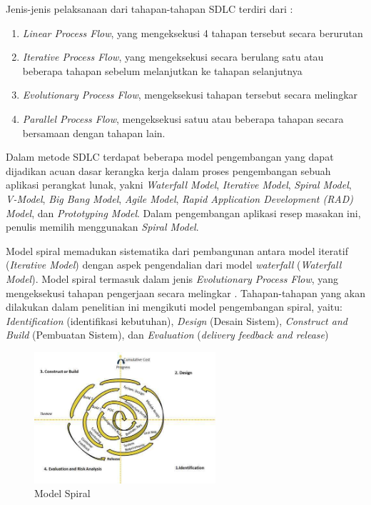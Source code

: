 	Jenis-jenis pelaksanaan dari tahapan-tahapan SDLC terdiri dari \cite{pressman}:
	\begin{enumerate}
		\item \emph{Linear Process Flow}, yang mengeksekusi 4 tahapan tersebut secara berurutan
		\item \emph{Iterative Process Flow}, yang mengeksekusi secara berulang satu atau beberapa tahapan sebelum melanjutkan ke tahapan selanjutnya
		\item \emph{Evolutionary Process Flow}, mengeksekusi tahapan tersebut secara melingkar
		\item \emph{Parallel Process Flow}, mengeksekusi satuu atau beberapa tahapan secara bersamaan dengan tahapan lain. 
	\end{enumerate}

	Dalam metode SDLC terdapat beberapa model pengembangan yang dapat dijadikan acuan dasar kerangka kerja dalam proses pengembangan sebuah aplikasi perangkat lunak, yakni \emph{Waterfall Model}, \emph{Iterative Model}, \emph{Spiral Model}, \emph{V-Model}, \emph{Big Bang Model}, \emph{Agile Model}, \emph{Rapid Application Development (RAD) Model}, dan \emph{Prototyping Model}. Dalam pengembangan aplikasi resep masakan ini, penulis memilih menggunakan \emph{Spiral Model}.
	
	Model spiral memadukan sistematika dari pembangunan antara model iteratif (\emph{Iterative Model}) dengan aspek pengendalian dari model \emph{waterfall} (\emph{Waterfall Model}). Model spiral termasuk dalam jenis \emph{Evolutionary Process Flow}, yang mengeksekusi tahapan pengerjaan secara melingkar \cite{tutorialspoint}. Tahapan-tahapan yang akan dilakukan dalam penelitian ini mengikuti model pengembangan spiral, yaitu: \emph{Identification} (identifikasi kebutuhan), \emph{Design} (Desain Sistem), \emph{Construct and Build} (Pembuatan Sistem), dan \emph{Evaluation} (\emph{delivery feedback and release})
    \begin{figure}[H]
		\centering
		\includegraphics[width=0.6\textwidth]{gambar/sdlc_spiral_model}
		\caption{Model Spiral}
		\label{sdlc_spiral_model}
	\end{figure}

